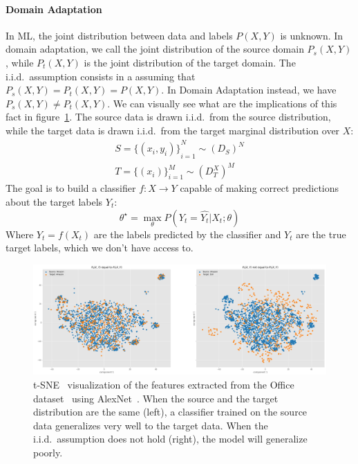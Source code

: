 \documentclass[../main.tex]{subfiles}
\begin{document}
    \paragraph{Domain Adaptation}
    In ML, the joint distribution between data and labels $P(X, Y)$ is unknown. In domain adaptation,
    we call the joint distribution of the source domain $ P_{s}(X, Y) $, while $ P_{t}(X, Y) $ is the joint distribution of
    the target domain. The i.i.d.\ assumption consists in a assuming that $ P_{s}(X, Y) = P_{t}(X, Y) = P(X, Y) $.
    In Domain Adaptation instead, we have $ P_{s}(X, Y) \neq P_{t}(X, Y) $. We can visually see what are the implications
    of this fact in figure~\ref{fig:AD-tsne}.
    \newline
    The source data is drawn i.i.d.\ from the source distribution, while the target data is drawn i.i.d.\ from the target marginal
    distribution over $X$:
    \begin{align*}
        S = {\{(x_{i}, y_{i})\}}_{i=1}^{N} \sim {(D_{S})}^{N} \\
        T = {\{(x_{i})\}}_{i=1}^{M} \sim {(D_{T}^{X})}^{M}
    \end{align*}
    The goal is to build a classifier $f : X \rightarrow Y$ capable of making correct predictions about the target labels $Y_{t}$:
    $$ \theta^{\star} = \max_{\theta} P(Y_{t} = \hat{Y_{t}} | X_{t} ; \theta) $$
    Where $\hat{Y_{t}} = f(X_{t})$ are the labels predicted by the classifier and $Y_{t}$ are the true target labels, which we
    don't have access to.

    \begin{figure}
        \centering{}
    	\includegraphics[width=\linewidth]{img/AD-alexnet-tsne.png}
        \caption{t-SNE~\cite{tsne} visualization of the features extracted from the Office dataset~\cite{office} using AlexNet~\cite{alexnet}.
        When the source and the target distribution are the same (left), a classifier trained on the source data generalizes very well to the target
        data. When the i.i.d.\ assumption does not hold (right), the model will generalize poorly.}\label{fig:AD-tsne}
	\end{figure}
\end{document}
